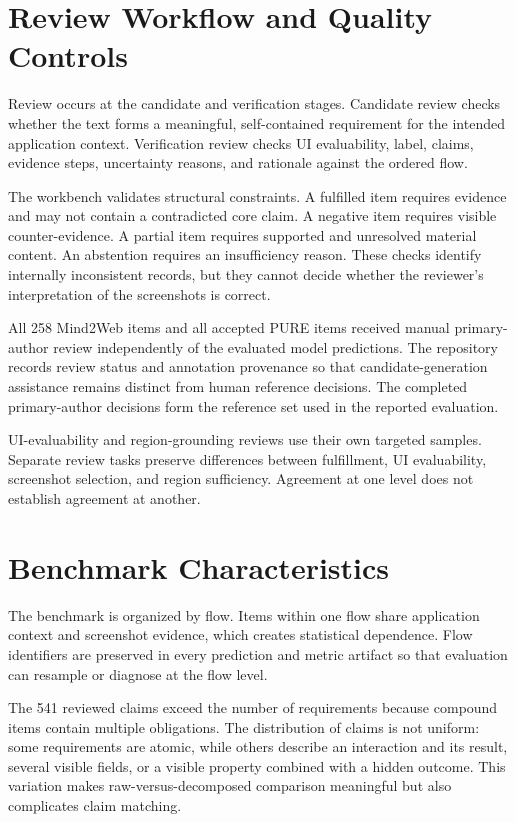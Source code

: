 \section{Review Workflow and Quality Controls}\label{review-workflow-and-quality-controls}

Review occurs at the candidate and verification stages. Candidate review checks
whether the text forms a meaningful, self-contained requirement for the
intended application context. Verification review checks UI evaluability,
label, claims, evidence steps, uncertainty reasons, and rationale against the
ordered flow.

The workbench validates structural constraints. A fulfilled item requires
evidence and may not contain a contradicted core claim. A negative item requires
visible counter-evidence. A partial item requires supported and unresolved
material content. An abstention requires an insufficiency reason. These checks
identify internally inconsistent records, but they cannot decide whether the
reviewer's interpretation of the screenshots is correct.

All 258 Mind2Web items and all accepted PURE items received manual
primary-author review independently of the evaluated model predictions. The
repository records review status and annotation provenance so that
candidate-generation assistance remains distinct from human reference
decisions. The completed primary-author decisions form the reference set used
in the reported evaluation.

UI-evaluability and region-grounding reviews use their own targeted samples.
Separate review tasks preserve differences between fulfillment, UI
evaluability, screenshot selection, and region sufficiency. Agreement at one
level does not establish agreement at another.

\section{Benchmark Characteristics}\label{benchmark-characteristics}

The benchmark is organized by flow. Items
within one flow share application context and screenshot evidence, which
creates statistical dependence. Flow identifiers are preserved in every
prediction and metric artifact so that evaluation can resample or diagnose at
the flow level.

The 541 reviewed claims exceed the number of requirements because compound
items contain multiple obligations. The distribution of claims is not uniform:
some requirements are atomic, while others describe an interaction and its
result, several visible fields, or a visible property combined with a hidden
outcome. This variation makes raw-versus-decomposed comparison meaningful but
also complicates claim matching.

